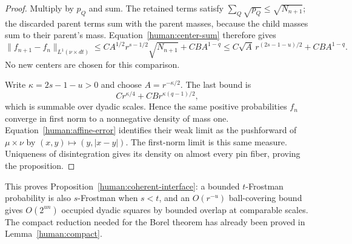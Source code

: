 \begin{proof}
Multiply by \(p_Q\) and sum. The retained terms satisfy
\(\sum_Q\sqrt{p_Q}\le\sqrt{N_{n+1}}\); the discarded parent
terms sum with the parent masses, because the child masses sum to
their parent's mass. Equation~\eqref{human:center-sum} therefore gives
\begin{equation}\label{human:coherent-comparison}
 \|f_{n+1}-f_n\|_{L^1(\nu\times dt)}
 \le C A^{1/2}r^{s-1/2}\sqrt{N_{n+1}}
       +CB A^{1-q}
 \le C\sqrt A\,r^{(2s-1-u)/2}+CB A^{1-q}.
\end{equation}
No new centers are chosen for this comparison.

Write \(\kappa=2s-1-u>0\) and choose \(A=r^{-\kappa/2}\).
The last bound is
\[
 C r^{\kappa/4}+CB r^{\kappa(q-1)/2},
\]
which is summable over dyadic scales. Hence the same positive
probabilities \(f_n\) converge in first norm to a nonnegative density
of mass one. Equation~\eqref{human:affine-error} identifies their weak
limit as the pushforward of \(\mu\times\nu\) by
\((x,y)\mapsto(y,|x-y|)\). The first-norm limit is this same measure.
Uniqueness of disintegration gives its density on almost every pin
fiber, proving the proposition.
\end{proof}

This proves Proposition~\ref{human:coherent-interface}: a bounded
\(t\)-Frostman probability is also \(s\)-Frostman when \(s<t\), and
an \(O(r^{-u})\) ball-covering bound gives \(O(2^{un})\) occupied dyadic
squares by bounded overlap at comparable scales. The compact reduction
needed for the Borel theorem has already been proved in
Lemma~\ref{human:compact}.
